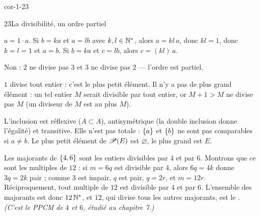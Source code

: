 \begin{blocLivre}{cor-1-23}
\begin{corrige}{23}{La divisibilité, un ordre partiel}
\begin{questions}
  \item {} $a=1\cdot a$.\quad
     Si $b=ka$ et $a=lb$ avec $k,l\in\mathbb{N}^{*}$, alors $a=kl\,a$, donc $kl=1$, donc
    $k=l=1$ et $a=b$.\quad
     Si $b=ka$ et $c=lb$, alors $c=(kl)\,a$.
  \item Non : $2$ ne divise pas $3$ et $3$ ne divise pas $2$ — l'ordre est partiel.
  \item $1$ divise tout entier : c'est le plus petit élément. Il n'y a pas de plus grand élément : un
    tel entier $M$ serait divisible par tout entier, or $M+1>M$ ne divise pas $M$ (un diviseur de $M$
    est au plus $M$).
  \item L'inclusion est réflexive ($A\subset A$), antisymétrique (la double inclusion donne l'égalité)
    et transitive. Elle n'est pas totale : $\left\{a\right\}$ et $\left\{b\right\}$ ne sont pas comparables si $a\neq b$.
    Le plus petit élément de $\mathscr{P}(E)$ est $\varnothing$, le plus grand est $E$.
  \item Les majorants de $\left\{4,6\right\}$ sont les entiers divisibles par $4$ et par $6$. Montrons que ce
    sont les multiples de $12$ : si $m=6q$ est divisible par $4$, alors $6q=4k$ donne $3q=2k$ pair ;
    comme $3$ est impair, $q$ est pair, $q=2r$, et $m=12r$. Réciproquement, tout multiple de $12$ est
    divisible par $4$ et par $6$. L'ensemble des majorants est donc $12\,\mathbb{N}^{*}$, et $12$, qui divise
    tous les autres majorants, est le .
    \emph{(C'est le PPCM de $4$ et $6$, étudié au chapitre 7.)}
\end{questions}
\end{corrige}
\end{blocLivre}

